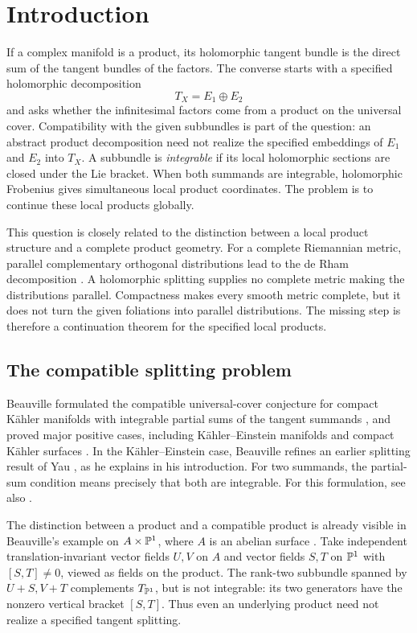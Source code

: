 \section{Introduction}\label{sec:intro}

If a complex manifold is a product, its holomorphic tangent bundle is the
direct sum of the tangent bundles of the factors. The converse starts
with a specified holomorphic decomposition
\[
T_X=E_1\oplus E_2
\]
and asks whether the infinitesimal factors come from a product on the
universal cover. Compatibility with the given subbundles is part of the
question: an abstract product decomposition need not realize the
specified embeddings of $E_1$ and $E_2$ into $T_X$.
A subbundle is \emph{integrable} if its local holomorphic sections are
closed under the Lie bracket. When both summands are integrable,
holomorphic Frobenius gives simultaneous local product coordinates.
The problem is to continue these local products globally.

This question is closely related to the distinction between a local
product structure and a complete product geometry. For a complete
Riemannian metric, parallel complementary orthogonal distributions lead
to the de Rham decomposition \cite{deRham52}. A holomorphic splitting supplies no
complete metric making the distributions parallel. Compactness makes
every smooth metric complete, but it does not turn the given foliations
into parallel distributions. The missing step is therefore a
continuation theorem for the specified local products.

\subsection*{The compatible splitting problem}

Beauville formulated the compatible
universal-cover conjecture for compact K\"ahler manifolds with
integrable partial sums of the tangent summands
\cite[Section~2.3]{Beauville00}, and proved major positive cases, including
K\"ahler--Einstein manifolds and compact K\"ahler surfaces
\cite[Theorems~A and~C]{Beauville00}. In the K\"ahler--Einstein case,
Beauville refines an earlier splitting result of Yau \cite{Yau93}, as
he explains in his introduction. For two summands, the partial-sum
condition means precisely that both are integrable. For this formulation,
see also
\cite[Conjecture~1.4]{Horing26}.

The distinction between a product and a compatible product is already
visible in Beauville's example on $A\times\mathbb P^1$, where $A$ is an
abelian surface \cite[Section~2.2]{Beauville00}. Take independent
translation-invariant vector fields $U,V$ on $A$ and vector fields
$S,T$ on $\mathbb P^1$ with $[S,T]\ne0$, viewed as fields on the product.
The rank-two subbundle spanned by $U+S,V+T$ complements $T_{\mathbb P^1}$,
but is not integrable: its two generators have the nonzero vertical
bracket $[S,T]$. Thus even an underlying product need not realize a
specified tangent splitting.

